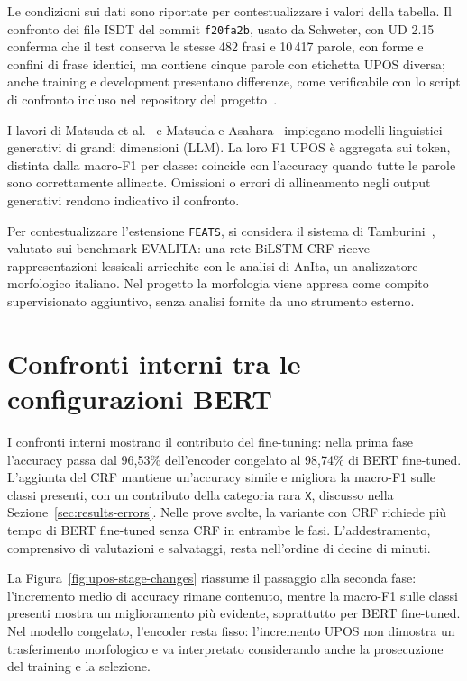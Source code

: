 \documentclass[12pt,a4paper]{report}
\begin{document}
Le condizioni sui dati sono riportate per contestualizzare i valori della tabella. Il confronto dei file ISDT del commit \texttt{f20fa2b}, usato da Schweter, con UD 2.15 conferma che il test conserva le stesse 482 frasi e 10\,417 parole, con forme e confini di frase identici, ma contiene cinque parole con etichetta UPOS diversa; anche training e development presentano differenze, come verificabile con lo script di confronto incluso nel repository del progetto~\cite{repo}.

I lavori di Matsuda et al.~\cite{matsuda2025} e Matsuda e Asahara~\cite{matsuda2026} impiegano modelli linguistici generativi di grandi dimensioni (LLM). La loro F1 UPOS è aggregata sui token, distinta dalla macro-F1 per classe: coincide con l'accuracy quando tutte le parole sono correttamente allineate. Omissioni o errori di allineamento negli output generativi rendono indicativo il confronto.

Per contestualizzare l'estensione \texttt{FEATS}, si considera il sistema di Tamburini~\cite{tamburini2016}, valutato sui benchmark EVALITA: una rete BiLSTM-CRF riceve rappresentazioni lessicali arricchite con le analisi di AnIta, un analizzatore morfologico italiano. Nel progetto la morfologia viene appresa come compito supervisionato aggiuntivo, senza analisi fornite da uno strumento esterno.

\section{Confronti interni tra le configurazioni BERT}
\label{sec:results-bert-comparison}

I confronti interni mostrano il contributo del fine-tuning: nella prima fase l'accuracy passa dal 96,53\% dell'encoder congelato al 98,74\% di BERT fine-tuned. L'aggiunta del CRF mantiene un'accuracy simile e migliora la macro-F1 sulle classi presenti, con un contributo della categoria rara \texttt{X}, discusso nella Sezione~\ref{sec:results-errors}. Nelle prove svolte, la variante con CRF richiede più tempo di BERT fine-tuned senza CRF in entrambe le fasi. L'addestramento, comprensivo di valutazioni e salvataggi, resta nell'ordine di decine di minuti.

La Figura~\ref{fig:upos-stage-changes} riassume il passaggio alla seconda fase: l'incremento medio di accuracy rimane contenuto, mentre la macro-F1 sulle classi presenti mostra un miglioramento più evidente, soprattutto per BERT fine-tuned. Nel modello congelato, l'encoder resta fisso: l'incremento UPOS non dimostra un trasferimento morfologico e va interpretato considerando anche la prosecuzione del training e la selezione.
\end{document}
